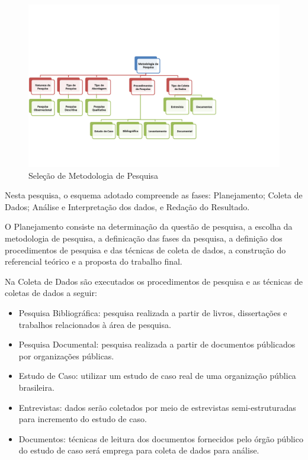 	\begin{figure}[h]
		\centering
		\label{fig01}
			\includegraphics[scale=0.7]{figuras/metodologiapesquisa.png}
		\caption{Seleção de Metodologia de Pesquisa}
	\end{figure}

Nesta pesquisa, o esquema adotado compreende as fases: Planejamento; Coleta
de Dados; Análise e Interpretação dos dados, e Redação do Resultado. 

O Planejamento consiste na determinação da questão de pesquisa, a escolha da metodologia de pesquisa, a definicação das fases da pesquisa,  a definição dos procedimentos de pesquisa e das técnicas de coleta de dados, a construção do referencial teórico e a proposta do trabalho final.


Na Coleta de Dados são executados os procedimentos de pesquisa e as técnicas de coletas de dados a seguir:

\begin{itemize}
\item Pesquisa Bibliográfica: pesquisa realizada a partir de livros, dissertações e trabalhos relacionados à área de pesquisa.
\item Pesquisa Documental: pesquisa realizada a partir de documentos públicados por organizações públicas.
\item Estudo de Caso: utilizar um estudo de caso real de uma organização pública brasileira.
\item Entrevistas: dados serão coletados por meio de estrevistas semi-estruturadas para incremento do estudo de caso.
\item Documentos: técnicas de leitura dos documentos fornecidos pelo órgão público do estudo de caso será emprega para coleta de dados para análise.
\end{itemize}

